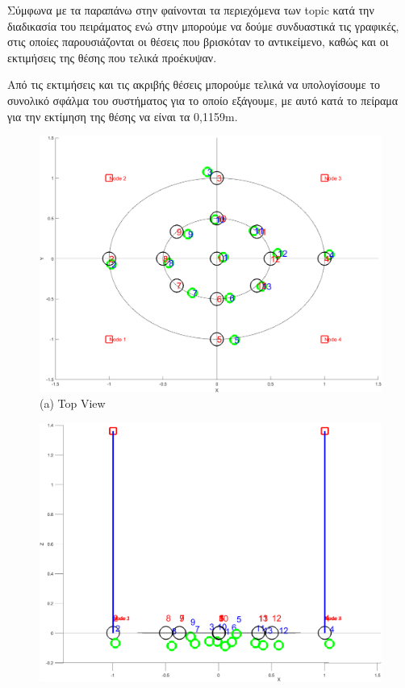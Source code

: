 Σύμφωνα με τα παραπάνω στην  φαίνονται τα περιεχόμενα των topic κατά την διαδικασία του πειράματος ενώ στην  μπορούμε να δούμε συνδυαστικά τις γραφικές, στις οποίες παρουσιάζονται οι θέσεις που βρισκόταν το αντικείμενο, καθώς και οι εκτιμήσεις της θέσης που τελικά προέκυψαν.

Από τις εκτιμήσεις και τις ακριβής θέσεις μπορούμε τελικά να υπολογίσουμε το συνολικό σφάλμα του συστήματος για το οποίο εξάγουμε, με αυτό κατά το πείραμα για την εκτίμηση της θέσης να είναι τα 0,1159m.

\begin{figure} [H]
	\centering
    \begin{minipage}{.5\textwidth}
      \centering
      \includegraphics[width=0.9\linewidth]{../Images/Experiments-Results/nodes-pos-with-est-up.png}\\
      {(a) Top View}
    \end{minipage}%
    \begin{minipage}{.5\textwidth}
      \centering
      \includegraphics[width=.9\linewidth]{../Images/Experiments-Results/nodes-pos-with-est-side.png}\\

\end{minipage}
\end{figure}
